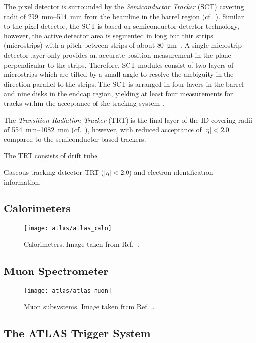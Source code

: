The pixel detector is surrounded by the \emph{Semiconductor Tracker} (SCT)
covering radii of \SIrange{299}{514}{\milli\metre} from the beamline in the
barrel region (cf.\ ). Similar to the pixel
detector, the SCT is based on semiconductor detector technology, however, the
active detector area is segmented in long but thin strips (microstrips) with a
pitch between strips of about \SI{80}{\micro\metre}~\cite{PERF-2007-01}. A
single microstrip detector layer only provides an accurate position measurement
in the plane perpendicular to the strips. Therefore, SCT modules consist of two
layers of microstrips which are tilted by a small angle to resolve the ambiguity
in the direction parallel to the strips. The SCT is arranged in four layers in
the barrel and nine disks in the endcap region, yielding at least four
measurements for tracks within the acceptance of the tracking
system~\cite{PERF-2007-01}.

The \emph{Transition Radiation Tracker} (TRT) is the final layer of the ID
covering radii of \SIrange{554}{1082}{\milli\metre} (cf.\
), however, with reduced acceptance of
$|\eta| < 2.0$ compared to the semiconductor-based trackers.

The TRT consists of drift tube


Gaseous tracking detector TRT ($|\eta| < 2.0$) and electron identification
information.


\subsection{Calorimeters}

\begin{figure}[htbp]
  \centering

  \texttt{[image: atlas/atlas\_calo]}

  \caption{Calorimeters. Image taken from Ref.~\cite{Pequenao:1095927}.}%
  \label{fig:atlas_calorimeters}
\end{figure}


\subsection{Muon Spectrometer}

\begin{figure}[htbp]
  \centering

  \texttt{[image: atlas/atlas\_muon]}

  \caption{Muon subsystems. Image taken from Ref.~\cite{Pequenao:1095929}.}%
  \label{fig:atlas_muon_system}

\end{figure}

\subsection{The ATLAS Trigger System}

